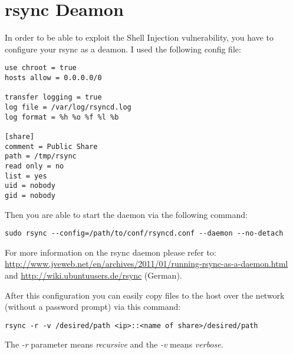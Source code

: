 \chapter{rsync Deamon}
\label{appendix:rsync}

In order to be able to exploit the Shell Injection vulnerability, you have to configure your rsync as a deamon. I used the following config file:

\begin{lstlisting}[caption=rsync Deaom config file]
use chroot = true
hosts allow = 0.0.0.0/0

transfer logging = true
log file = /var/log/rsyncd.log
log format = %h %o %f %l %b

[share]
comment = Public Share
path = /tmp/rsync
read only = no
list = yes
uid = nobody
gid = nobody
\end{lstlisting}

Then you are able to start the daemon via the following command:

\begin{lstlisting}[caption=Command to start rsync Daemon]
sudo rsync --config=/path/to/conf/rsyncd.conf --daemon --no-detach
\end{lstlisting}

For more information on the rsync daemon please refer to: \url{http://www.jveweb.net/en/archives/2011/01/running-rsync-as-a-daemon.html} and \url{http://wiki.ubuntuusers.de/rsync} (German).

After this configuration you can easily copy files to the host over the network (without a password prompt) via this command:

\begin{lstlisting}[caption=Copy files to the configured rsync share]
rsync -r -v /desired/path <ip>::<name of share>/desired/path
\end{lstlisting}

The \textit{-r} parameter means \textit{recursive} and the \textit{-v} means \textit{verbose}.